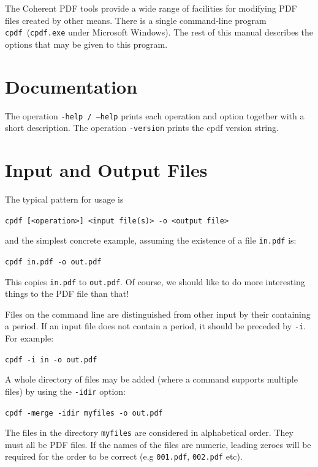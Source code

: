 \documentclass{book}
\newcommand{\cpdf}{\texttt{cpdf}}
\begin{document}
  The Coherent PDF tools provide a wide range of facilities for modifying PDF
files created by other means. There is a single command-line program
\cpdf\ (\texttt{cpdf.exe} under Microsoft Windows). The rest of this manual describes the options that may be given
to this program.

\section{Documentation}

The operation \texttt{-help / --help} prints each operation and option together with a short description. The operation \texttt{-version} prints the cpdf version string.

   
  \section{Input and Output Files}
  The typical pattern for usage is
  \begin{framed}
  \noindent\small\verb!cpdf [<operation>] <input file(s)> -o <output file>!
  \end{framed}
  \noindent and the simplest concrete example, assuming the existence of a file
\texttt{in.pdf} is:
  \begin{framed}
  \noindent\small\verb!cpdf in.pdf -o out.pdf!
  \end{framed}
  \noindent This copies \texttt{in.pdf} to \texttt{out.pdf}. Of course, we should like to do more interesting
things to the PDF file than that!

  Files on the command line are distinguished from other input by their
containing a period. If an input file does not contain a period, it should be
preceded by \verb!-i!. For example:

  \begin{framed}
  \noindent\small\verb!cpdf -i in -o out.pdf!
  \end{framed}
\noindent A whole directory of files may be added (where a command supports multiple files) by using the \verb!-idir! option:
  \begin{framed}
  \noindent\small\verb!cpdf -merge -idir myfiles -o out.pdf!
  \end{framed}
  \noindent The files in the directory \verb!myfiles! are considered in alphabetical order. They must all be PDF files. If the names of the files are numeric, leading zeroes will be required for the order to be correct (e.g \verb!001.pdf!, \verb!002.pdf! etc).
\end{document}
